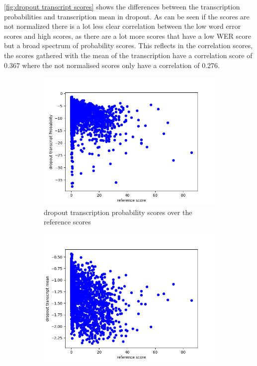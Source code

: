 \autoref{fig:dropout transcript scores} shows the differences between the transcription probabilities and transcription mean in dropout. 
As can be seen if the scores are not normalized there is a lot less clear correlation between the low word error scores and high scores, as there are a lot more scores that have a low WER score but a broad spectrum of probability scores. This reflects in the correlation scores, the scores gathered with the mean of the transcription have a correlation score of 0.367 where the not normalised scores only have a correlation of 0.276. 
\begin{figure}[ht]
    \centering
    \begin{subfigure}{0.4\linewidth}
        \includegraphics[width=\textwidth]{Latex/sections/images/seamlessdropouttranscript.png}
        \caption{dropout transcription probability scores over the reference scores}
    \end{subfigure}
    \begin{subfigure}{0.4\linewidth}
        \includegraphics[width=\textwidth]{Latex/sections/images/seamlessdropouttranscriptmean.png}

\end{subfigure}
\end{figure}
